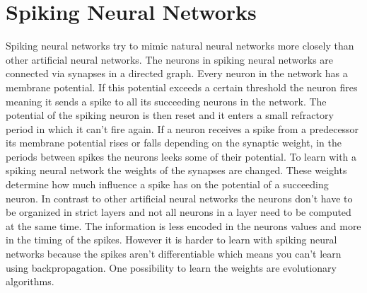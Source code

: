 \section{Spiking Neural Networks}
Spiking neural networks try to mimic natural neural networks more closely than other artificial neural networks.
The neurons in spiking neural networks are connected via synapses in a directed graph.
Every neuron in the network has a membrane potential.
If this potential exceeds a certain threshold the neuron fires meaning it sends a spike to all its succeeding neurons in the network.
The potential of the spiking neuron is then reset and it enters a small refractory period in which it can't fire again.
If a neuron receives a spike from a predecessor its membrane potential rises or falls depending on the synaptic weight, in the periods between spikes the neurons leeks some of their potential.
To learn with a spiking neural network the weights of the synapses are changed.
These weights determine how much influence a spike has on the potential of a succeeding neuron.
In contrast to other artificial neural networks the neurons don't have to be organized in strict layers and not all neurons in a layer need to be computed at the same time.
The information is less encoded in the neurons values and more in the timing of the spikes.
However it is harder to learn with spiking neural networks because the spikes aren't differentiable which means you can't learn using backpropagation.
One possibility to learn the weights are evolutionary algorithms.